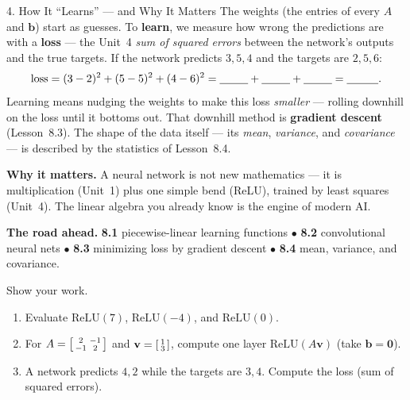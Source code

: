 \documentclass[10pt]{article}
\newcommand{\vv}{\mathbf{v}}
\newcommand{\bb}{\mathbf{b}}
\newcommand{\zero}{\mathbf{0}}
\newcommand{\relu}{\mathrm{ReLU}}
\begin{document}
\begin{notesbox}{4. How It ``Learns'' --- and Why It Matters}
The weights (the entries of every $A$ and $\bb$) start as guesses. To \textbf{learn}, we measure how wrong
the predictions are with a \textbf{loss} --- the Unit~4 \emph{sum of squared errors} between the network's
outputs and the true targets. If the network predicts $3,5,4$ and the targets are $2,5,6$:
\[
  \text{loss}=(3-2)^2+(5-5)^2+(4-6)^2=\blank{0.9cm}+\blank{0.9cm}+\blank{0.9cm}=\blank{1.0cm}.
\]
Learning means nudging the weights to make this loss \emph{smaller} --- rolling downhill on the loss until
it bottoms out. That downhill method is \textbf{gradient descent} (Lesson~8.3). The shape of the data
itself --- its \emph{mean}, \emph{variance}, and \emph{covariance} --- is described by the statistics of
Lesson~8.4.

\vspace{2pt}
\textbf{Why it matters.} A neural network is not new mathematics --- it is \blank{3.2cm} multiplication
(Unit~1) plus one simple bend (ReLU), trained by least squares (Unit~4). The linear algebra you already
know is the engine of modern AI.

\vspace{2pt}
\textbf{The road ahead.} \textbf{8.1} piecewise-linear learning functions\; $\bullet$\;
\textbf{8.2} convolutional neural nets\; $\bullet$\; \textbf{8.3} minimizing loss by gradient descent\;
$\bullet$\; \textbf{8.4} mean, variance, and covariance.
\end{notesbox}

\begin{practicebox}
Show your work.
\begin{enumerate}[leftmargin=1.6em, itemsep=4pt]
  \item Evaluate $\relu(7)$, $\relu(-4)$, and $\relu(0)$. \writeline
  \item For $A=\begin{bsmallmatrix} 2 & -1\\ -1 & 2 \end{bsmallmatrix}$ and $\vv=\begin{bsmallmatrix} 1\\ 3 \end{bsmallmatrix}$, compute one layer $\relu(A\vv)$ (take $\bb=\zero$). \writeline
  \item A network predicts $4,2$ while the targets are $3,4$. Compute the loss (sum of squared errors). \writeline
\end{enumerate}
\end{practicebox}
\end{document}
